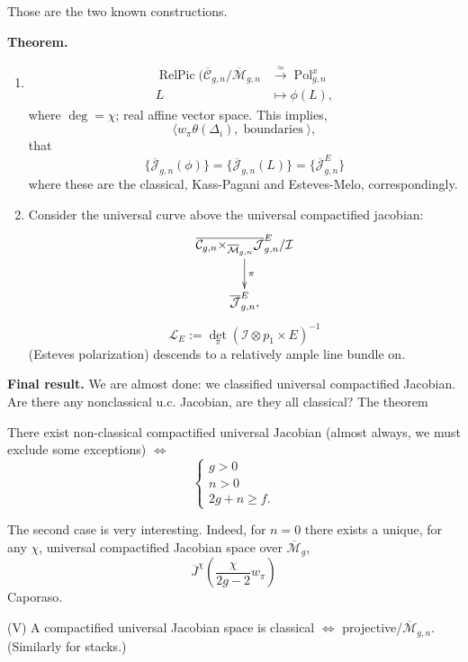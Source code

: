 \medskip\noindent
Those are the two known constructions.

\medskip\noindent
{\bf Theorem.}

\begin{theorem}
\label{theorem-comp-jac}
\begin{enumerate}
\item 
$$
\begin{aligned}
\operatorname{RelPic}
(\overline{\mathcal{C}}_{g,n}
/\overline{\mathcal{M}}_{g,n}
&\xrightarrow{\simeq}
\operatorname{Pol}_{g,n}^x \\
L &\longmapsto \phi(L),
\end{aligned}
$$
where $\operatorname{deg}=\chi$;
real affine vector space.
This implies,
$$
\langle w_\pi\theta(\Delta_i),\operatorname{boundaries}
\rangle,
$$
that
$$
\{\overline{\mathcal{J}}_{g,n}(\phi)\}
=
\{\overline{\mathcal{J}}_{g,n}(L)\}
=
\{\overline{\mathcal{J}}_{g,n}^E\}
$$
where these are the classical, Kass-Pagani
and
Esteves-Melo, correspondingly.

\item Consider the universal curve above the
universal compactified jacobian:
$$
\xymatrix{
\overline{\mathcal{C}_{g,n}
\times_{\overline{\mathcal{M}}_{g,n}}}
\overline{\mathcal{J}}_{g,n}^E/\mathcal{I}
\ar[d]^\pi\\
\overline{\mathcal{J}}_{g,n}^E,
}
$$
$$
\mathcal{L}_E
:= \det_\pi(\mathcal{I} \otimes
p_1 \times E)^{-1}
$$
(Esteves polarization)
descends to a relatively ample line bundle
on.
\end{enumerate}
\end{theorem}


\medskip\noindent
{\bf Final result.}
We are almost done: we classified universal
compactified Jacobian. Are there any
nonclassical u.c. Jacobian, are they all
classical? The theorem 

\begin{theorem}
\label{theorem-main-b}
There exist non-classical compactified
universal Jacobian (almost always, we
must exclude some exceptions)
$\iff$
$$
\begin{cases}
g>0\\
n>0\\
2g+n \geq f.
\end{cases}
$$

\noindent
The second case is very interesting.
Indeed, for $n=0$ there exists a unique,
for any $\chi$, universal compactified
Jacobian space over
$\overline{\mathcal{M}}_g$,
$$
\overline{J}^\chi
\left(\frac{\chi}{2g-2}w_\pi\right)
$$
Caporaso.

\item (V) A compactified universal Jacobian
space is classical $\iff $
projective/$\overline{\mathcal{M}}_{g,n}$.
(Similarly for stacks.)

\end{theorem}









